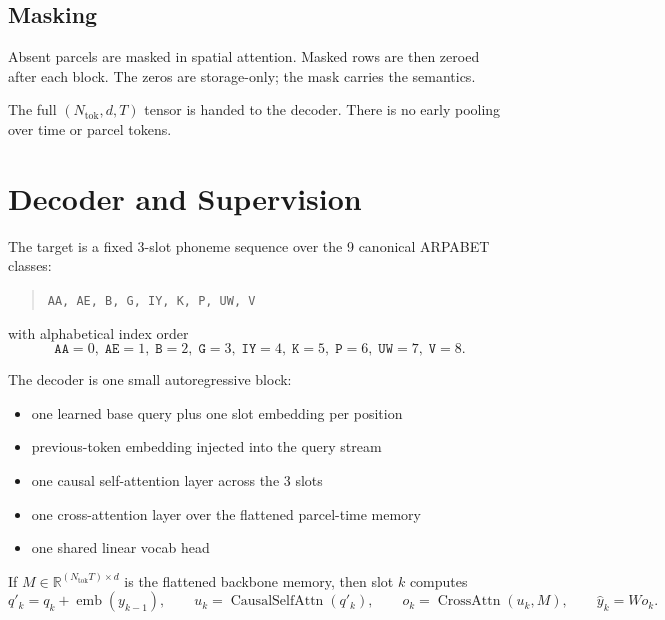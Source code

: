 \documentclass[11pt,letterpaper]{article}
\newcommand{\R}{\mathbb{R}}
\begin{document}
\subsection{Masking}

Absent parcels are masked in spatial attention. Masked rows are then zeroed after each block. The zeros are storage-only; the mask carries the semantics.

The full \((N_{\text{tok}}, d, T)\) tensor is handed to the decoder. There is no early pooling over time or parcel tokens.


\section{Decoder and Supervision}

The target is a fixed 3-slot phoneme sequence over the 9 canonical ARPABET classes:
\begin{quote}
\texttt{AA, AE, B, G, IY, K, P, UW, V}
\end{quote}
with alphabetical index order
\begin{equation}
\texttt{AA}=0,\;
\texttt{AE}=1,\;
\texttt{B}=2,\;
\texttt{G}=3,\;
\texttt{IY}=4,\;
\texttt{K}=5,\;
\texttt{P}=6,\;
\texttt{UW}=7,\;
\texttt{V}=8.
\end{equation}

The decoder is one small autoregressive block:
\begin{itemize}[leftmargin=2em, itemsep=0.2em]
\item one learned base query plus one slot embedding per position
\item previous-token embedding injected into the query stream
\item one causal self-attention layer across the 3 slots
\item one cross-attention layer over the flattened parcel-time memory
\item one shared linear vocab head
\end{itemize}

If \(M \in \R^{(N_{\text{tok}}T) \times d}\) is the flattened backbone memory, then slot $k$ computes
\begin{equation}
q'_k = q_k + \operatorname{emb}(y_{k-1}),
\qquad
u_k = \operatorname{CausalSelfAttn}(q'_k),
\qquad
o_k = \operatorname{CrossAttn}(u_k, M),
\qquad
\hat{y}_k = W o_k.
\end{equation}
\end{document}
